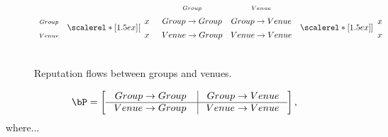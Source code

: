 \begin{figure}[h]
  \label{fig:groups-venues}
  \centering \small
  \def\x{\begin{array}{c}x\\x\end{array}}
  \(
  \let\svarraycolsep\arraycolsep
  \renewcommand\arraystretch{1.4}
  \begin{array}{c}
   \\
   {\scriptstyle Group}\\
   {\scriptstyle Venue}\\
  \\
  \end{array}
  \begin{array}{c}
   \\
   \scalerel*[1.5ex]{[}{\x}\\
  \\
  \end{array}
  \begin{array}{c}
   {\scriptstyle Group}\\
   Group \rightarrow Group \\
   Venue  \rightarrow Group \\
  \\
  \end{array}
  \begin{array}{c}
   {\scriptstyle Venue}\\
   Group  \rightarrow Venue \\
   Venue   \rightarrow Venue \\
  \\
  \end{array}
  \begin{array}{c}
   \\
   \scalerel*[1.5ex]{]}{\x}\\
  \\
  \end{array}
  \mathrm{}
  \arraycolsep\svarraycolsep
  \renewcommand\arraystretch{1.0}
  \)
  \caption{Reputation flows between groups and venues.}
\end{figure}


\begin{align}\label{eq:newp}
\bP =
\left[
\begin{array}{r | r}
\ Group \rightarrow Group \ \ & \ Group \rightarrow Venue\ \\
\hline
\ Venue \rightarrow Group \ \ & \ Venue \rightarrow Venue\ \\
\end{array}
\right],
\end{align}
\noindent where...



